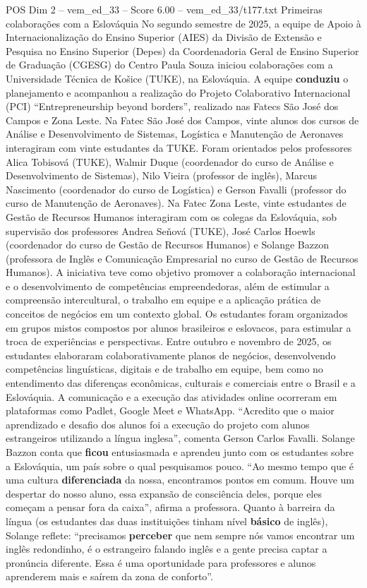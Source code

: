 \begin{textsample}{POS Dim 2 – vem\_ed\_33 – Score 6.00 – vem\_ed\_33/t177.txt}  \label{ex:f2_pos_140}
Primeiras colaborações com a Eslováquia No segundo semestre de 2025, a equipe de Apoio à Internacionalização do Ensino Superior (AIES) da Divisão de Extensão e Pesquisa no Ensino Superior (Depes) da Coordenadoria Geral de Ensino Superior de Graduação (CGESG) do Centro Paula Souza iniciou colaborações com a Universidade Técnica de Košice (TUKE), na Eslováquia.
A equipe \textbf{conduziu} o planejamento e acompanhou a realização do Projeto Colaborativo Internacional (PCI) “Entrepreneurship beyond borders”, realizado nas Fatecs São José dos Campos e Zona Leste.
Na Fatec São José dos Campos, vinte alunos dos cursos de Análise e Desenvolvimento de Sistemas, Logística e Manutenção de Aeronaves interagiram com vinte estudantes da TUKE.
Foram orientados pelos professores Alica Tobisová (TUKE), Walmir Duque (coordenador do curso de Análise e Desenvolvimento de Sistemas), Nilo Vieira (professor de inglês), Marcus Nascimento (coordenador do curso de Logística) e Gerson Favalli (professor do curso de Manutenção de Aeronaves).
Na Fatec Zona Leste, vinte estudantes de Gestão de Recursos Humanos interagiram com os colegas da Eslováquia, sob supervisão dos professores Andrea Seňová (TUKE), José Carlos Hoewls (coordenador do curso de Gestão de Recursos Humanos) e Solange Bazzon (professora de Inglês e Comunicação Empresarial no curso de Gestão de Recursos Humanos).
A iniciativa teve como objetivo promover a colaboração internacional e o desenvolvimento de competências empreendedoras, além de estimular a compreensão intercultural, o trabalho em equipe e a aplicação prática de conceitos de negócios em um contexto global.
Os estudantes foram organizados em grupos mistos compostos por alunos brasileiros e eslovacos, para estimular a troca de experiências e perspectivas.
Entre outubro e novembro de 2025, os estudantes elaboraram colaborativamente planos de negócios, desenvolvendo competências linguísticas, digitais e de trabalho em equipe, bem como no entendimento das diferenças econômicas, culturais e comerciais entre o Brasil e a Eslováquia.
A comunicação e a execução das atividades online ocorreram em plataformas como Padlet, Google Meet e WhatsApp. “Acredito que o maior aprendizado e desafio dos alunos foi a execução do projeto com alunos estrangeiros utilizando a língua inglesa”, comenta Gerson Carlos Favalli.
Solange Bazzon conta que \textbf{ficou} entusiasmada e aprendeu junto com os estudantes sobre a Eslováquia, um país sobre o qual pesquisamos pouco. “Ao mesmo tempo que é uma cultura \textbf{diferenciada} da nossa, encontramos pontos em comum.
Houve um despertar do nosso aluno, essa expansão de consciência deles, porque eles começam a pensar fora da caixa”, afirma a professora.
Quanto à barreira da língua (os estudantes das duas instituições tinham nível \textbf{básico} de inglês), Solange reflete: “precisamos \textbf{perceber} que nem sempre nós vamos encontrar um inglês redondinho, é o estrangeiro falando inglês e a gente precisa captar a pronúncia diferente.
Essa é uma oportunidade para professores e alunos aprenderem mais e saírem da zona de conforto”.

\end{textsample}
